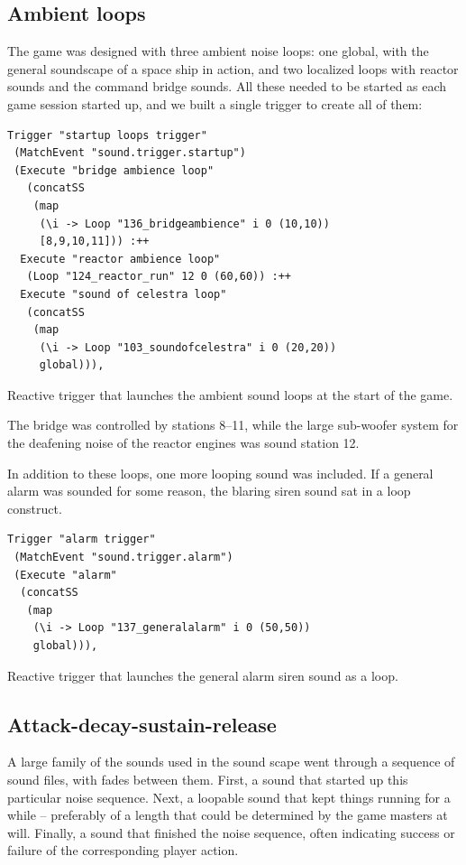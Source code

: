 \subsection{Ambient loops}
\label{sec:ambient-loops}

The game was designed with three ambient noise loops: one global, with the general soundscape of a space ship in action, and two localized loops with reactor sounds and the command bridge sounds. All these needed to be started as each game session started up, and we built a single trigger to create all of them:

\begin{listing}
\begin{verbatim}
Trigger "startup loops trigger" 
 (MatchEvent "sound.trigger.startup") 
 (Execute "bridge ambience loop" 
   (concatSS 
    (map 
     (\i -> Loop "136_bridgeambience" i 0 (10,10)) 
     [8,9,10,11])) :++
  Execute "reactor ambience loop" 
   (Loop "124_reactor_run" 12 0 (60,60)) :++
  Execute "sound of celestra loop" 
   (concatSS  
    (map 
     (\i -> Loop "103_soundofcelestra" i 0 (20,20)) 
     global))),
\end{verbatim}
\caption{Reactive trigger that launches the ambient sound loops at the
start of the game.}
\end{listing}

The bridge was controlled by stations 8--11, while the large sub-woofer system for the deafening noise of the reactor engines was sound station 12. 

In addition to these loops, one more looping sound was included. If a general alarm was sounded for some reason, the blaring siren sound sat in a loop construct.

\begin{listing}
\begin{verbatim}
Trigger "alarm trigger" 
 (MatchEvent "sound.trigger.alarm") 
 (Execute "alarm" 
  (concatSS 
   (map 
    (\i -> Loop "137_generalalarm" i 0 (50,50)) 
    global))),
\end{verbatim}
\caption{Reactive trigger that launches the general alarm siren sound
  as a loop.}
\end{listing}

\subsection{Attack-decay-sustain-release}
\label{sec:attack-decay-sustain}

A large family of the sounds used in the sound scape went through a sequence of sound files, with fades between them. First, a sound that started up this particular noise sequence. Next, a loopable sound that kept things running for a while -- preferably of a length that could be determined by the game masters at will. Finally, a sound that finished the noise sequence, often indicating success or failure of the corresponding player action.

